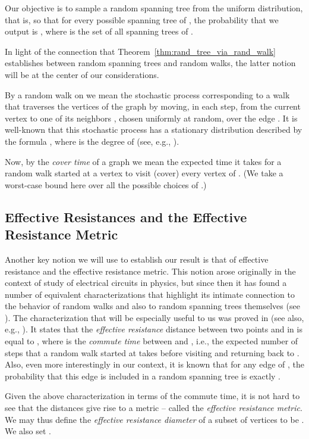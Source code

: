 \documentclass[11pt, letterpaper]{article}
\begin{document}
Our objective is to sample a random spanning tree  from the uniform distribution, that is, so that for every possible spanning tree  of , the probability that we output  is , where  is the set of all spanning trees of .

In light of the connection that Theorem~\ref{thm:rand_tree_via_rand_walk} establishes between random spanning trees and random walks, the latter notion will be at the center of our considerations.

By a random walk on  we mean the stochastic process corresponding to a walk that traverses the vertices of the graph by moving, in each step, from the current vertex  to one of its neighbors , chosen uniformly at random, over the edge . It is well-known that this stochastic process has a stationary distribution described by the formula , where  is the degree of  (see, e.g., \cite{Lovasz93}).

Now, by the {\em cover time}  of a graph  we mean the expected time it takes for a random walk started at a vertex  to visit (cover) every vertex of . (We take a worst-case bound here over all the possible choices of .)

\subsection{Effective Resistances and the Effective Resistance Metric}
\label{sec:effective_resistance}

Another key notion we will use to establish our result is that of effective resistance and the effective resistance metric. This notion arose originally in the context of study of electrical circuits in physics, but since then it has found a number of equivalent characterizations that highlight its intimate connection to the behavior of random walks and also to random spanning trees themselves (see \cite{DoyleS84,Bollobas98,LyonsP13,Lovasz93}). The characterization that will be especially useful to us was proved in \cite{ChandraRRS89} (see also, e.g., \cite{Lovasz93}). It states that the {\em effective resistance} distance  between two points  and  in  is equal to , where  is the {\em commute time} between  and , i.e., the expected number of steps that a random walk started at  takes before visiting  and returning back to .  Also, even more interestingly in our context, it is known that for any edge  of , the probability that this edge is included in a random spanning tree is exactly . 

Given the above characterization in terms of the commute time, it is not hard to see that the distances  give rise to a metric -- called the {\em effective resistance metric}. We may thus define the {\em effective resistance diameter} of a subset of vertices  to be . We also set .
\end{document}
